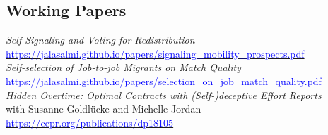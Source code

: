 \documentclass[16pt]{article}
\begin{document}
\subsection*{Working Papers}

\noindent \textit{Self-Signaling and Voting for Redistribution} \\ \href{https://jalasalmi.github.io/papers/signaling\_mobility\_prospects.pdf}{\textcolor{blue}{https://jalasalmi.github.io/papers/signaling\_mobility\_prospects.pdf}} \\

\noindent \textit{Self-selection of Job-to-job Migrants on Match Quality} \\ \href{https://jalasalmi.github.io/papers/selection\_on\_job\_match\_quality.pdf}{\textcolor{blue}{https://jalasalmi.github.io/papers/selection\_on\_job\_match\_quality.pdf}} \\

\noindent \textit{Hidden Overtime: Optimal Contracts with (Self-)deceptive Effort Reports} \\
with Susanne Goldlücke and Michelle Jordan \\  \href{https://cepr.org/publications/dp18105}{\textcolor{blue}{https://cepr.org/publications/dp18105}} 

%
%
%
\vfill
\end{document}
